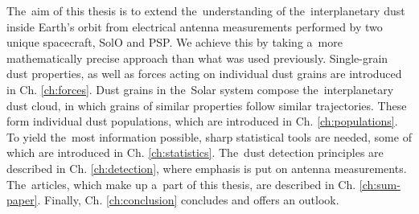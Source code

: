 The~aim of this thesis is to extend the~understanding of the~interplanetary dust inside Earth's orbit from electrical antenna measurements performed by two unique spacecraft, SolO and PSP. We achieve this by taking a~more mathematically precise approach than what was used previously. Single-grain dust properties, as well as forces acting on individual dust grains are introduced in Ch. \ref{ch:forces}. Dust grains in the~Solar system compose the~interplanetary dust cloud, in which grains of similar properties follow similar trajectories. These form individual dust populations, which are introduced in Ch. \ref{ch:populations}. To yield the~most information possible, sharp statistical tools are needed, some of which are introduced in Ch. \ref{ch:statistics}. The~dust detection principles are described in Ch. \ref{ch:detection}, where emphasis is put on antenna measurements. The~articles, which make up a~part of this thesis, are described in Ch. \ref{ch:sum-paper}. Finally, Ch. \ref{ch:conclusion} concludes and offers an outlook.